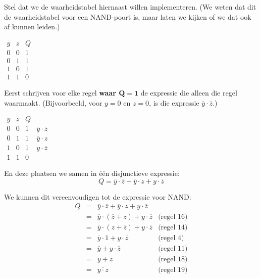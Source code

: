 \documentclass[11pt,a5paper]{report}
\begin{document}
\begin{minipage}[t]{0.60\textwidth}
Stel dat we de waarheidstabel hiernaast willen implementeren. (We weten dat dit de waarheidstabel voor een NAND-poort is, maar laten we kijken of we dat ook af kunnen leiden.)
\end{minipage}%
\hfill
\begin{minipage}[t]{0.30\textwidth}
\vspace*{-1em}
\(
\begin{array}{cc|c}
y & z & Q \\
\hline
0 & 0 & 1 \\
0 & 1 & 1 \\
1 & 0 & 1 \\
1 & 1 & 0
\end{array}
\)
\end{minipage}




\begin{minipage}[t]{0.60\textwidth}
Eerst schrijven voor elke regel \textbf{waar $\bm{Q = 1}$ } de expressie die alleen die regel waarmaakt. (Bijvoorbeeld, voor $y = 0$ en $z = 0$, is die expressie $\overline{y} \cdot \overline{z}$.)
\end{minipage}%
\hfill
\begin{minipage}[t]{0.30\textwidth}
\vspace*{-1em}
\(
\begin{array}{cc|c||l}
y & z & Q \\
\hline
0 & 0 & 1 & \overline{y} \cdot \overline{z}\\
0 & 1 & 1 & \overline{y} \cdot z\\
1 & 0 & 1 & y \cdot \overline{z}\\
1 & 1 & 0
\end{array}
\)
\end{minipage}


En deze plaatsen we samen in één disjunctieve expressie:
\[
Q = \overline{y} \cdot \overline{z} + \overline{y} \cdot z + y \cdot \overline{z}
\]

We kunnen dit vereenvoudigen tot de expressie voor NAND:
\[
\begin{array}{rcll}
Q &=&\overline{y} \cdot \overline{z} + \overline{y} \cdot z + y \cdot \overline{z} \\ 
    &=&\overline{y} \cdot (\overline{z} + z) + y \cdot \overline{z} & \text{(regel 16)}\\
    &=&\overline{y} \cdot (z + \overline{z}) + y \cdot \overline{z} & \text{(regel 14)}\\
   &=& \overline{y} \cdot 1 + y \cdot \overline{z} & \text{(regel 4)}\\
   &=& \overline{y} + y \cdot \overline{z} & \text{(regel 11)}\\
   &=& \overline{y} + \overline{z} & \text{(regel 18)}\\
   &=& \overline{y \cdot z} & \text{(regel 19)}
\end{array}
\]
\end{document}
